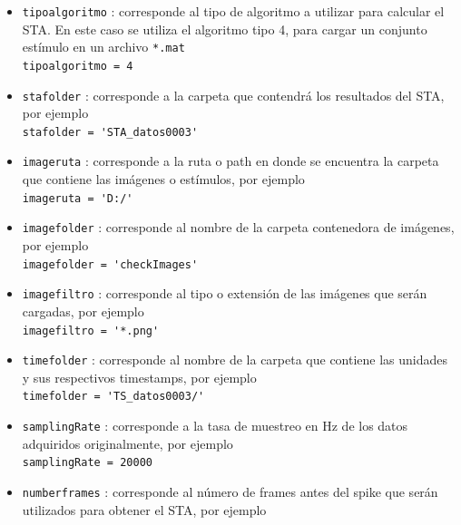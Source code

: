 \documentclass[10pt]{article}
\begin{document}
\begin{itemize}
\item \verb+tipoalgoritmo+ : corresponde al tipo de algoritmo a utilizar para calcular el STA. En este caso se utiliza el algoritmo tipo 4, para cargar un conjunto estímulo en un archivo \verb+*.mat+ \\

\verb+tipoalgoritmo = 4+ \\

\item \verb+stafolder+ : corresponde a la carpeta que contendrá los resultados del STA, por ejemplo \\

\verb+stafolder = 'STA_datos0003'+ \\

\item \verb+imageruta+ : corresponde a la ruta o path en donde se encuentra la carpeta que contiene las imágenes o estímulos, por ejemplo \\

\verb+imageruta = 'D:/'+ \\

\item \verb+imagefolder+ : corresponde al nombre de la carpeta contenedora de imágenes, por ejemplo \\

\verb+imagefolder = 'checkImages'+ \\

\item \verb+imagefiltro+ : corresponde al tipo o extensión de las imágenes que serán cargadas, por ejemplo \\

\verb+imagefiltro = '*.png'+\\

\item \verb+timefolder+ : corresponde al nombre de la carpeta que contiene las unidades y sus respectivos timestamps, por ejemplo  \\

\verb+timefolder = 'TS_datos0003/'+ \\

\item \verb+samplingRate+ : corresponde a la tasa de muestreo en Hz de los datos adquiridos originalmente, por ejemplo \\

\verb+samplingRate = 20000+ \\

\item \verb+numberframes+ : corresponde al número de frames antes del spike que serán utilizados para obtener el STA, por ejemplo \\


\end{itemize}
\end{document}
